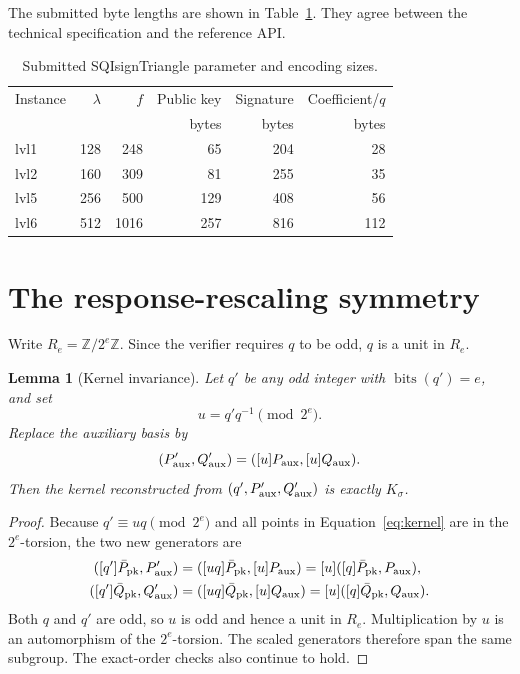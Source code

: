 \documentclass[11pt,a4paper]{article}
\newtheorem{lemma}[theorem]{Lemma}
\newcommand{\Z}{\mathbb{Z}}
\newcommand{\bits}{\operatorname{bits}}
\begin{document}
The submitted byte lengths are shown in Table~\ref{tab:params}. They agree
between the technical specification and the reference API.

\begin{table}[t]
\centering
\caption{Submitted SQIsignTriangle parameter and encoding sizes.}
\label{tab:params}
\begin{tabular}{@{}lrrrrr@{}}
\toprule
Instance & $\lambda$ & $f$ & Public key & Signature & Coefficient/$q$ \\
         &           &     & bytes      & bytes     & bytes \\
\midrule
lvl1 & 128 & 248  & 65  & 204 & 28  \\
lvl2 & 160 & 309  & 81  & 255 & 35  \\
lvl5 & 256 & 500  & 129 & 408 & 56  \\
lvl6 & 512 & 1016 & 257 & 816 & 112 \\
\bottomrule
\end{tabular}
\end{table}

\section{The response-rescaling symmetry}

Write $R_e=\Z/2^e\Z$. Since the verifier requires $q$ to be odd, $q$ is a
unit in $R_e$.

\begin{lemma}[Kernel invariance]
\label{lem:kernel}
Let $q'$ be any odd integer with $\bits(q')=e$, and set
\begin{equation}
                     u=q'q^{-1}\pmod{2^e}.
 \label{eq:u}
\end{equation}
Replace the auxiliary basis by
\[
  (P'_{\rm aux},Q'_{\rm aux})=([u]P_{\rm aux},[u]Q_{\rm aux}).
\]
Then the kernel reconstructed from $(q',P'_{\rm aux},Q'_{\rm aux})$ is exactly
$K_\sigma$.
\end{lemma}

\begin{proof}
Because $q'\equiv uq\pmod{2^e}$ and all points in
Equation~\eqref{eq:kernel} are in the $2^e$-torsion, the two new generators are
\begin{align*}
 ([q']\bar P_{\rm pk},P'_{\rm aux})
   &=([uq]\bar P_{\rm pk},[u]P_{\rm aux})
     =[u]([q]\bar P_{\rm pk},P_{\rm aux}),\\
 ([q']\bar Q_{\rm pk},Q'_{\rm aux})
   &=([uq]\bar Q_{\rm pk},[u]Q_{\rm aux})
     =[u]([q]\bar Q_{\rm pk},Q_{\rm aux}).
\end{align*}
Both $q$ and $q'$ are odd, so $u$ is odd and hence a unit in $R_e$.
Multiplication by $u$ is an automorphism of the $2^e$-torsion. The scaled
generators therefore span the same subgroup. The exact-order checks also
continue to hold.
\end{proof}
\end{document}
